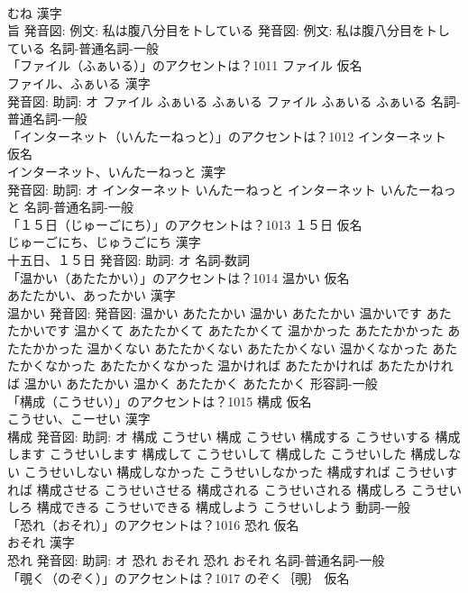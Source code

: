 \documentclass[8pt]{extreport}
\begin{document}
\begin{CJK}{UTF8}{min}
\\	むね 漢字　
\\	旨 発音図: 例文: 私は腹八分目をトしている 発音図: 例文: 私は腹八分目をトしている							名詞-普通名詞-一般 
\\	「ファイル（ふぁいる）」のアクセントは？1011	ファイル 仮名　
\\	ファイル、ふぁいる 漢字　
\\	発音図: 助詞: オ	ファイル ふぁいる ふぁいる		ファイル ふぁいる ふぁいる				名詞-普通名詞-一般 
\\	「インターネット（いんたーねっと）」のアクセントは？1012	インターネット 仮名　
\\	インターネット、いんたーねっと 漢字　
\\	発音図: 助詞: オ	インターネット いんたーねっと		インターネット いんたーねっと				名詞-普通名詞-一般 
\\	「１５日（じゅーごにち）」のアクセントは？1013	１５日 仮名　
\\	じゅーごにち、じゅうごにち 漢字　
\\	十五日、１５日 発音図: 助詞: オ							名詞-数詞 
\\	「温かい（あたたかい）」のアクセントは？1014	温かい 仮名　
\\	あたたかい、あったかい 漢字　
\\	温かい 発音図: 発音図:	温かい あたたかい		温かい あたたかい 温かいです あたたかいです 温かくて あたたかくて あたたかくて 温かかった あたたかかった あたたかかった 温かくない あたたかくない あたたかくない 温かくなかった あたたかくなかった あたたかくなかった 温かければ あたたかければ あたたかければ 温かい あたたかい 温かく あたたかく あたたかく				形容詞-一般 
\\	「構成（こうせい）」のアクセントは？1015	構成 仮名　
\\	こうせい、こーせい 漢字　
\\	構成 発音図: 助詞: オ	構成 こうせい		構成 こうせい 構成する こうせいする 構成します こうせいします 構成して こうせいして 構成した こうせいした 構成しない こうせいしない 構成しなかった こうせいしなかった 構成すれば こうせいすれば 構成させる こうせいさせる 構成される こうせいされる 構成しろ こうせいしろ 構成できる こうせいできる 構成しよう こうせいしよう				動詞-一般 
\\	「恐れ（おそれ）」のアクセントは？1016	恐れ 仮名　
\\	おそれ 漢字　
\\	恐れ 発音図: 助詞: オ	恐れ おそれ		恐れ おそれ				名詞-普通名詞-一般 
\\	「覗く（のぞく）」のアクセントは？1017	のぞく｛覗｝ 仮名　

\end{CJK}
\end{document}
